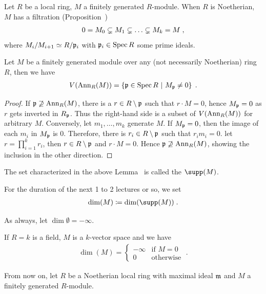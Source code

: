 \documentclass[a4paper,parskip=half,numbers=enddot, DIV=12]{scrreprt}
\begin{document}
Let $R$ be a local ring, $M$ a finitely generated $R$-module. When $R$ is Noetherian, $M$ has a filtration (Proposition~)
\begin{align}
    0 = M_0\subsetneq M_1\subsetneq\ldots \subsetneq M_k = M\;, \lbl{eq:filtrationByPrimeIdeals}
\end{align}
where $M_i/M_{i+1} \simeq R/\mathfrak{p}_i$ with $\mathfrak{p}_i\in\operatorname{Spec} R$ some prime ideals.

\begin{lem}
    Let $M$ be a finitely generated module over any (not necessarily Noetherian) ring $R$, then we have
    \begin{align*}
        V(\operatorname{Ann}_R(M)) = \left\{\mathfrak{p}\in \operatorname{Spec} R\ \middle|\  M_{\mathfrak{p}}\neq 0\right\}\;.
    \end{align*}
\end{lem}
\begin{proof}
    If $\mathfrak{p}\not\supseteq \operatorname{Ann}_R(M)$, there is a $r\in R\setminus \mathfrak{p}$ such that $r\cdot M = 0$, hence $M_{\mathfrak{p}}=0$ as $r$ gets inverted in $R_{\mathfrak{p}}$. Thus the right-hand side is a subset of $V(\operatorname{Ann}_R(M))$ for arbitrary $M$. Conversely, let $m_1,\ldots, m_k$ generate $M$. If $M_{\mathfrak{p}} = 0$, then the image of each $m_i$ in $M_{\mathfrak{p}}$ is $0$. Therefore, there is $r_i\in R\setminus \mathfrak{p}$ such that $r_im_i = 0$. let $r = \prod_{i=1}^k r_i$, then $r\in R\setminus \mathfrak{p}$ and $r\cdot M = 0$. Hence $\mathfrak{p}\not\supseteq \operatorname{Ann}_R(M)$, showing the inclusion in the other direction.
\end{proof}

\begin{defi}[Support]
    \begin{alphanumerate}
    \item 
        The set characterized in the above Lemma~ is called the  $\supp(M)$.
    \item  
        For the duration of  the next 1 to 2 lectures or so, we set 
        \begin{align*}
            \dim(M) \coloneqq \dim(\supp(M))\;.
        \end{align*}
    \end{alphanumerate}
\end{defi}
\begin{rem*}
    \begin{alphanumerate}
    \item 
        As always, let $\dim \emptyset = -\infty$.
    \item
        If $R=k$ is a field, $M$ is a $k$-vector space and we have
        \begin{align*}
            \dim(M) = \begin{cases}-\infty & \text{if } M=0 \\ 0 &\text{otherwise}\end{cases}\;.
        \end{align*}
    \end{alphanumerate}
\end{rem*}
From now on, let $R$ be a Noetherian local ring with maximal ideal $\mathfrak{m}$ and $M$ a finitely generated $R$-module.
\end{document}
